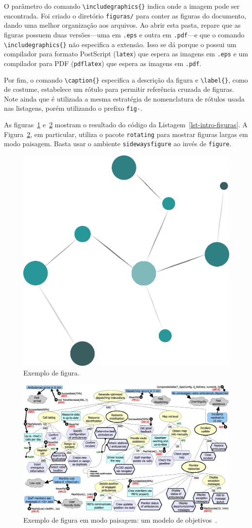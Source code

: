 O parâmetro do comando \texttt{\textbackslash includegraphics\{\}} indica onde a imagem pode ser encontrada. Foi criado o diretório \texttt{figuras/} para conter as figuras do documento, dando uma melhor organização aos arquivos. Ao abrir esta pasta, repare que as figuras possuem duas versões---uma em \texttt{.eps} e outra em \texttt{.pdf}---e que o comando \texttt{\textbackslash includegraphics\{\}} não especifica a extensão. Isso se dá porque o \latex possui um compilador para formato PostScript (\texttt{latex}) que espera as imagens em \texttt{.eps} e um compilador para PDF (\texttt{pdflatex}) que espera as imagens em \texttt{.pdf}.

Por fim, o comando \texttt{\textbackslash caption\{\}} especifica a descrição da figura e \texttt{\textbackslash label\{\}}, como de costume, estabelece um rótulo para permitir referência cruzada de figuras. Note ainda que é utilizada a mesma estratégia de nomenclatura de rótulos usada nas listagens, porém utilizando o prefixo \texttt{fig-}.

As figuras~\ref{fig-fundteo-exemplo} e~\ref{fig-fundteo-exemplosideways} mostram o resultado do código da Listagem~\ref{lst-intro-figuras}. A Figura~\ref{fig-fundteo-exemplosideways}, em particular, utiliza o pacote \texttt{rotating} para mostrar figuras largas em modo paisagem. Basta usar o ambiente \texttt{sidewaysfigure} ao invés de \texttt{figure}.

\begin{figure}
\centering
\includegraphics[width=.25\textwidth]{figuras/fig-fundteo-exemplo.png} 
\caption{Exemplo de figura.}
\label{fig-fundteo-exemplo}
\end{figure}

\begin{figure}
\centering
\includegraphics[width=\textwidth]{figuras/fig-fundteo-exemplosideways} 
\caption{Exemplo de figura em modo paisagem: um modelo de objetivos~\cite{souza-mylopoulos:spe13}.}
\label{fig-fundteo-exemplosideways}
\end{figure}



